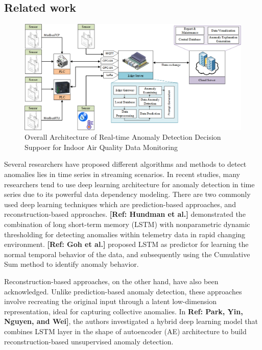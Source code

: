 \documentclass[final,3p,times,twocolumn]{elsarticle}
\begin{document}
\subsection{Related work}
\begin{figure}[t]
	\centering
	\includegraphics[width=12cm]{Architecture} 
	\caption[width=0.5\paperwidth]{Overall Architecture of Real-time Anomaly Detection Decision Suppoer for Indoor Air Quality Data Monitoring}\label{fig:architecture}
\end{figure}
Several researchers have proposed different algorithms and methods to detect anomalies lies in time series in streaming scenarios. In recent studies, many researchers tend to use deep learning architecture for anomaly detection in time series due to its powerful data dependency modeling. There are two commonly used deep learning techniques which are prediction-based approaches, and reconstruction-based approaches. \textbf{[Ref: Hundman et al.]} demonstrated the combination of long short-term memory (LSTM) with nonparametric dynamic thresholding for detecting anomalies within telemetry data in rapid changing environment. \textbf{[Ref: Goh et al.]} proposed LSTM as predictor for learning the normal temporal behavior of the data, and subsequently using the Cumulative Sum method to identify anomaly behavior. 

Reconstruction-based approaches, on the other hand, have also been acknowledged. Unlike prediction-based anomaly detection, these approaches involve recreating the original input through a latent low-dimension representation, ideal for capturing collective anomalies. In \textbf{Ref: Park, Yin, Nguyen, and Wei]}, the authors investigated a hybrid deep learning model that combines LSTM layer in the  shape of autoencoder (AE) architecture to build reconstruction-based unsupervised anomaly detection. 
\end{document}
